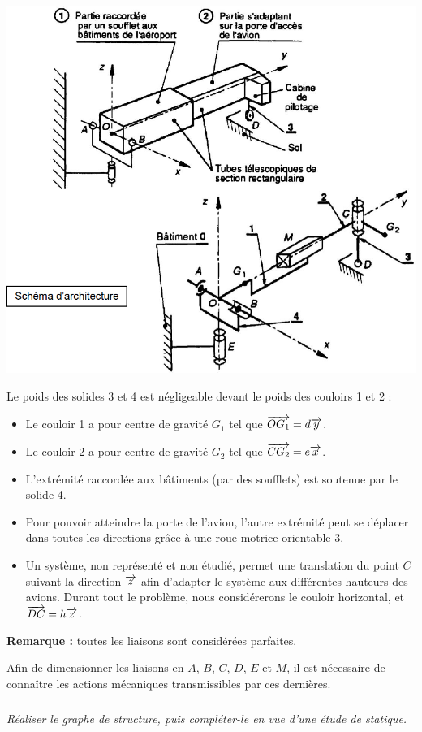 \documentclass[10pt]{article}
\begin{document}
\begin{center}
\includegraphics[width=.7\textwidth]{images/pas3}
\end{center}

Le poids des solides 3 et 4 est négligeable devant le poids des couloirs 1 et 2 :
\begin{itemize}
\item Le couloir 1 a pour centre de gravité $G_1$ tel que $\overrightarrow{OG_1} = d \overrightarrow{y}$.
\item Le couloir 2 a pour centre de gravité $G_2$ tel que $\overrightarrow{CG_2} = e \overrightarrow{x}$.
\end{itemize}

\begin{itemize}
\item L’extrémité raccordée aux bâtiments (par des soufflets) est soutenue par le solide 4.
\item Pour pouvoir atteindre la porte de l’avion, l’autre extrémité peut se déplacer dans toutes les
directions grâce à une roue motrice orientable 3.
\item Un système, non représenté et non étudié, permet une translation du point $C$ suivant la direction
$\overrightarrow{z}$ afin d’adapter le système aux différentes hauteurs des avions. Durant tout le problème, nous
considérerons le couloir horizontal, et $\overrightarrow{DC}= h\overrightarrow{z}$.
\end{itemize}

\textbf{Remarque : } toutes les liaisons sont considérées parfaites.

Afin de dimensionner les liaisons en $A$, $B$, $C$, $D$, $E$ et $M$, il est nécessaire de connaître les actions
mécaniques transmissibles par ces dernières.

\subparagraph{}
\textit{Réaliser le graphe de structure, puis compléter-le en vue d’une étude de statique.}
\end{document}

